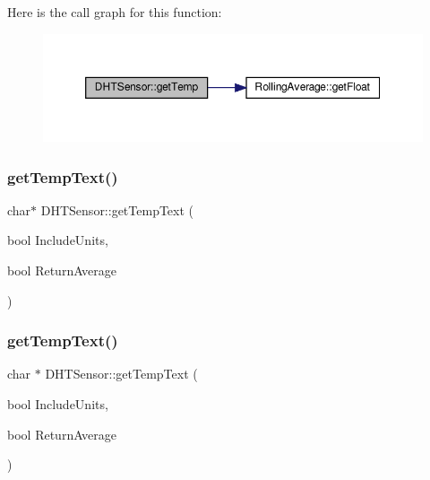 Here is the call graph for this function\+:
\nopagebreak
\begin{figure}[H]
\begin{center}
\leavevmode
\includegraphics[width=350pt]{class_d_h_t_sensor_acd945543fd907dfd5dd6c1dcd4612af1_cgraph}
\end{center}
\end{figure}
\mbox{\label{class_d_h_t_sensor_a7b53fb890dd45e04dec5dfe6d9207608}} 
\subsubsection{\texorpdfstring{get\+Temp\+Text()}{getTempText()}\hspace{0.1cm}{\footnotesize\ttfamily [1/2]}}
{\footnotesize\ttfamily char$\ast$ D\+H\+T\+Sensor\+::get\+Temp\+Text (\begin{DoxyParamCaption}\item[{bool}]{Include\+Units,  }\item[{bool}]{Return\+Average }\end{DoxyParamCaption})}

\mbox{\label{class_d_h_t_sensor_ae2091b0774bf7504477c469efd053631}} 
\subsubsection{\texorpdfstring{get\+Temp\+Text()}{getTempText()}\hspace{0.1cm}{\footnotesize\ttfamily [2/2]}}
{\footnotesize\ttfamily char $\ast$ D\+H\+T\+Sensor\+::get\+Temp\+Text (\begin{DoxyParamCaption}\item[{bool}]{Include\+Units,  }\item[{bool}]{Return\+Average }\end{DoxyParamCaption})}



